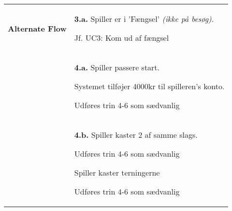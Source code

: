 \documentclass[class=article, crop=false]{standalone}
\begin{document}
\begin{table}[H]
\begin{tabularx}{\textwidth}{|l|X|}
    \textbf{Alternate Flow}   & \textbf{3.a.} Spiller er i 'Fængsel' \textit{(ikke på besøg)}.
    \begin{enumerate} \begin{tabenum}
                          \item Jf. UC3: Kom ud af fængsel
    \end{tabenum} \end{enumerate}
    \\



                              & \textbf{4.a.} Spiller passere start.
                                \begin{enumerate} \begin{tabenum}
                                        \item Systemet tilføjer 4000kr til spilleren's konto.
                                        \item Udføres trin 4-6 som sædvanlig
                                    \end{tabenum} \end{enumerate}
                                 \\
                              & \textbf{4.b.} Spiller kaster 2 af samme slags.
            \begin{enumerate} \begin{tabenum}
                                  \item Udføres trin 4-6 som sædvanlig
                                  \item Spiller kaster terningerne
                                  \item Udføres trin 4-6 som sædvanlig
            \end{tabenum} \end{enumerate}
            \\





\end{tabularx}
\end{table}
\end{document}
